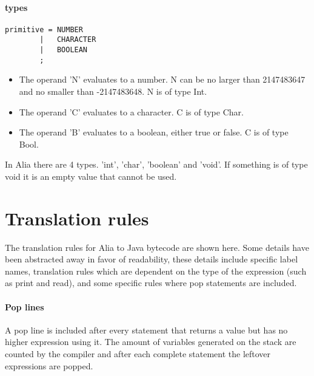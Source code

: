\documentclass[paper=a4, fontsize=11pt]{article}
\numberwithin{equation}{section}		%
\numberwithin{figure}{section}			%
\numberwithin{table}{section}				%
\begin{document}
\paragraph{types}
\begin{verbatim}
primitive =	NUMBER
		|	CHARACTER
		|	BOOLEAN
		;
\end{verbatim}
\begin{itemize}
\item The operand 'N' evaluates to a number. N can be no larger than 2147483647 and no smaller than -2147483648. N is of type Int.
\item The operand 'C' evaluates to a character. C is of type Char.
\item The operand 'B' evaluates to a boolean, either true or false. C is of type Bool.
\end{itemize}
In Alia there are 4 types. 'int', 'char', 'boolean' and 'void'. If something is of type void it is an empty value that cannot be used.

\section{Translation rules} %
The translation rules for Alia to Java bytecode are shown here. Some details have been abstracted away in favor of readability, these details include specific label names, translation rules which are dependent on the type of the expression (such as print and read), and some specific rules where pop statements are included.

\paragraph{Pop lines}
A pop line is included after every statement that returns a value but has no higher expression using it. The amount of variables generated on the stack are counted by the compiler and after each complete statement the leftover expressions are popped.
\end{document}
